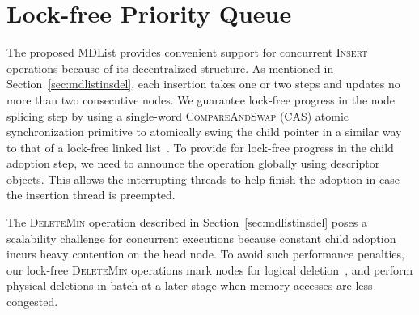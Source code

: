 \documentclass[10pt,journal,letter,compsoc]{IEEEtran}
\begin{document}
\section{Lock-free Priority Queue}
\label{sec:cpqueue}
The proposed MDList provides convenient support for concurrent \textsc{Insert} operations because of its decentralized structure.
As mentioned in Section~\ref{sec:mdlistinsdel}, each insertion takes one or two steps and updates no more than two consecutive nodes.
We guarantee lock-free progress in the node splicing step by using a single-word \textsc{CompareAndSwap} (CAS) atomic synchronization primitive to atomically swing the child pointer in a similar way to that of a lock-free linked list~\cite{harris2001pragmatic}. 
To provide for lock-free progress in the child adoption step, we need to announce the operation globally using descriptor objects. 
This allows the interrupting threads to help finish the adoption in case the insertion thread is preempted.

The \textsc{DeleteMin} operation described in Section~\ref{sec:mdlistinsdel} poses a scalability challenge for concurrent executions because constant child adoption incurs heavy contention on the head node.
To avoid such performance penalties, our lock-free \textsc{DeleteMin} operations mark nodes for logical deletion~\cite{fraser2004practical}, and perform physical deletions in batch at a later stage when memory accesses are less congested.
\end{document}
